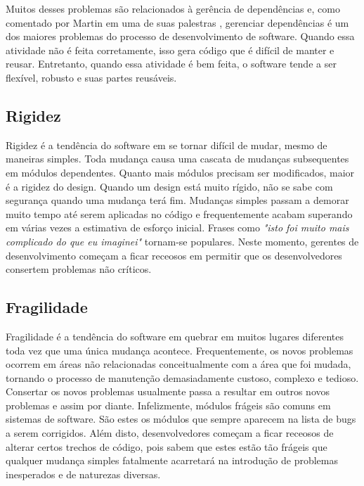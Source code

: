 Muitos desses problemas são relacionados à gerência de dependências e, como comentado por Martin em
uma de suas palestras \cite{bobmartin-infoq}, gerenciar dependências é um dos maiores problemas do processo de desenvolvimento de software.
Quando essa atividade não é feita corretamente, isso gera código que é difícil de manter e reusar. Entretanto, quando essa atividade
é bem feita, o software tende a ser flexível, robusto e suas partes reusáveis.

\subsection{Rigidez}
\label{subsec:rigidez}

Rigidez é a tendência do software em se tornar difícil de mudar, mesmo de maneiras simples. Toda mudança causa uma cascata de mudanças subsequentes em módulos dependentes. Quanto mais módulos precisam ser modificados, maior é a rigidez do design. Quando um design está muito rígido, não se sabe com segurança quando uma mudança terá fim. Mudanças simples passam a demorar muito tempo até serem aplicadas no código e frequentemente acabam superando em várias vezes a estimativa de esforço inicial. Frases como \textit{"isto foi muito mais complicado do que eu imaginei"} tornam-se populares. Neste momento, gerentes de desenvolvimento começam a ficar receosos em permitir que os desenvolvedores consertem problemas não críticos.


\subsection{Fragilidade}
\label{subsec:fragilidade}

Fragilidade é a tendência do software em quebrar em muitos lugares diferentes toda vez que uma única mudança acontece. Frequentemente, os novos problemas ocorrem em áreas não relacionadas conceitualmente com a área que foi mudada, tornando o processo de manutenção demasiadamente custoso, complexo e tedioso. Consertar os novos problemas usualmente passa a resultar em outros novos problemas e assim por diante. Infelizmente, módulos frágeis são comuns em sistemas de software. São estes os módulos que sempre aparecem na lista de bugs a serem corrigidos. Além disto, desenvolvedores começam a ficar receosos de alterar certos trechos de código, pois sabem que estes estão tão frágeis que qualquer mudança simples fatalmente acarretará na introdução de problemas inesperados e de naturezas diversas. 


